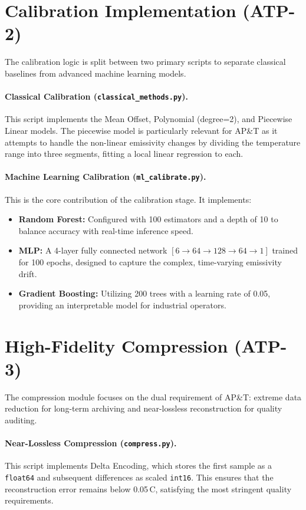 \section{Calibration Implementation (ATP-2)}
\label{sec:impl-calibrate}

The calibration logic is split between two primary scripts to separate classical baselines from advanced machine learning models.

\paragraph{Classical Calibration (\texttt{classical\_methods.py}).}
This script implements the Mean Offset, Polynomial (degree=2), and Piecewise Linear models. The piecewise model is particularly relevant for AP\&T as it attempts to handle the non-linear emissivity changes by dividing the temperature range into three segments, fitting a local linear regression to each.

\paragraph{Machine Learning Calibration (\texttt{ml\_calibrate.py}).}
This is the core contribution of the calibration stage. It implements:
\begin{itemize}[leftmargin=2em]
    \item \textbf{Random Forest:} Configured with 100 estimators and a depth of 10 to balance accuracy with real-time inference speed.
    \item \textbf{MLP:} A 4-layer fully connected network $[6\!\rightarrow\!64\!\rightarrow\!128\!\rightarrow\!64\!\rightarrow\!1]$ trained for 100 epochs, designed to capture the complex, time-varying emissivity drift.
    \item \textbf{Gradient Boosting:} Utilizing 200 trees with a learning rate of 0.05, providing an interpretable model for industrial operators.
\end{itemize}

\section{High-Fidelity Compression (ATP-3)}
\label{sec:impl-compress}

The compression module focuses on the dual requirement of AP\&T: extreme data reduction for long-term archiving and near-lossless reconstruction for quality auditing.

\paragraph{Near-Lossless Compression (\texttt{compress.py}).}
This script implements Delta Encoding, which stores the first sample as a \texttt{float64} and subsequent differences as scaled \texttt{int16}. This ensures that the reconstruction error remains below 0.05\,\textdegree C, satisfying the most stringent quality requirements.

